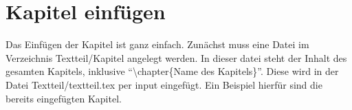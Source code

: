 \chapter{Kapitel einfügen}
Das Einfügen der Kapitel ist ganz einfach. Zunächst muss eine Datei im Verzeichnis Textteil/Kapitel angelegt werden. In dieser datei steht der Inhalt des gesamten Kapitels, inklusive \enquote{\textbackslash chapter\{Name des Kapitels\}}. Diese wird in der Datei Textteil/textteil.tex per input eingefügt. Ein Beispiel hierfür sind die bereits eingefügten Kapitel.